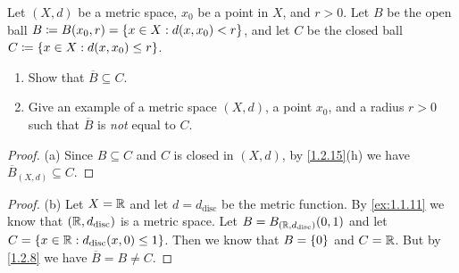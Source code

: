 \begin{ex}\label{ex:1.2.4}
  Let \((X, d)\) be a metric space, \(x_0\) be a point in \(X\), and \(r > 0\).
  Let \(B\) be the open ball \(B \coloneqq B(x_0, r) = \left\lbrace x \in X : d(x, x_0) < r\right\rbrace\), and let \(C\) be the closed ball \(C \coloneqq \left\lbrace x \in X : d(x, x_0) \leq r\right\rbrace\).
  \begin{enumerate}
    \item Show that \(\overline{B} \subseteq C\).
    \item Give an example of a metric space \((X, d)\), a point \(x_0\), and a radius \(r > 0\) such that \(\overline{B}\) is \emph{not} equal to \(C\).
  \end{enumerate}
\end{ex}

\begin{proof}{(a)}
  Since \(B \subseteq C\) and \(C\) is closed in \((X, d)\), by \cref{1.2.15}(h) we have \(\overline{B}_{(X, d)} \subseteq C\).
\end{proof}

\begin{proof}{(b)}
  Let \(X = \mathbb{R}\) and let \(d = d_{\text{disc}}\) be the metric function.
  By \cref{ex:1.1.11} we know that \((\mathbb{R}, d_{\text{disc}})\) is a metric space.
  Let \(B = B_{(\mathbb{R}, d_{\text{disc}})}(0, 1)\) and let \(C = \left\lbrace x \in \mathbb{R} : d_{\text{disc}}(x, 0) \leq 1\right\rbrace\).
  Then we know that \(B = \left\lbrace0\right\rbrace\) and \(C = \mathbb{R}\).
  But by \cref{1.2.8} we have \(\overline{B} = B \neq C\).
\end{proof}